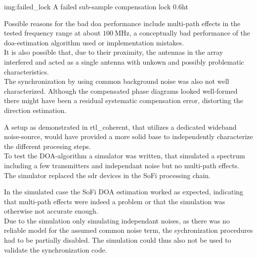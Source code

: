              {img:failed_lock}
             {A failed sub-sample compensation lock}
             {0.6}{ht}

Possible reasons for the bad \gls{doa} performance include
multi-path effects in the tested frequency range
at about $\SI{100}{\mega\hertz}$, a conceptually bad
performance of the \gls{doa}-estimation algorithm used
or implementation mistakes. \\

It is also possible that, due to their proximity,
the antennas in the array interfered and acted
as a single antenna with unkown and
possibly problematic characteristics. \\

The synchronization by using common background noise
was also not well characterized.
Although the compensated phase diagrams looked well-formed
there might have been a residual systematic
compensation error, distorting the direction estimation.

A setup as demonstrated in rtl\_coherent\cite{rtlcoherent}, that
utilizes a dedicated wideband noise-source, would
have provided a more solid base to independently characterize
the different procesing steps. \\

To test the DOA-algorithm a simulator
was written, that simulated a spectrum
including a few transmitters and independant noise but no
multi-path effects.
The simulator replaced the \gls{sdr} devices in the
SoFi processing chain.

In the simulated case the SoFi DOA estimation
worked as expected, indicating that multi-path
effects were indeed a problem or that the simulation
was otherwise not accurate enough. \\

Due to the simulation only simulating independant
noises, as there was no reliable model for the
assumed common noise term, the sychronization
procedures had to be partially disabled.
The simulation could thus also not be used
to validate the synchronization code. \\
